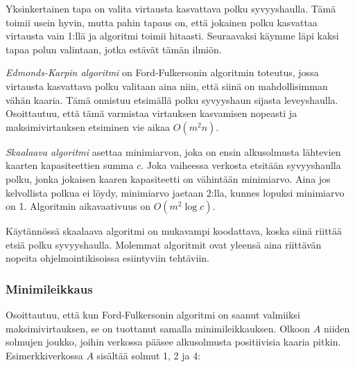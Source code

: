 Yksinkertainen tapa on valita virtausta kasvattava
polku syvyyshaulla.
Tämä toimii usein hyvin, mutta pahin tapaus on,
että jokainen polku
kasvattaa virtausta vain 1:llä ja algoritmi toimii hitaasti.
Seuraavaksi käymme läpi kaksi tapaa polun valintaan,
jotka estävät tämän ilmiön.

\textit{Edmonds-Karpin algoritmi} on
Ford-Fulkersonin algoritmin toteutus,
jossa virtausta kasvattava polku valitaan
aina niin, että siinä on mahdollisimman vähän kaaria.
Tämä onnistuu etsimällä polku syvyyshaun
sijasta leveyshaulla.
Osoittautuu, että tämä varmistaa virtauksen
kasvamisen nopeasti ja
maksimivirtauksen etsiminen vie aikaa $O(m^2 n)$.

\textit{Skaalaava algoritmi}
asettaa minimiarvon, joka on ensin alkusolmusta
lähtevien kaarten kapasiteettien summa $c$.
Joka vaiheessa verkosta etsitään
syvyyshaulla polku, jonka jokaisen kaaren kapasiteetti
on vähintään minimiarvo.
Aina jos kelvollista polkua ei löydy,
minimiarvo jaetaan 2:lla,
kunnes lopuksi minimiarvo on 1.
Algoritmin aikavaativuus on $O(m^2 \log c)$.

Käytännössä skaalaava algoritmi on mukavampi koodattava,
koska siinä riittää etsiä polku syvyyshaulla.
Molemmat algoritmit ovat yleensä aina riittävän
nopeita ohjelmointikisoissa esiintyviin tehtäviin.

\subsubsection{Minimileikkaus}

Osoittautuu, että kun Ford-Fulkersonin algoritmi on saanut valmiiksi
maksimivirtauksen, se on tuottanut samalla minimileikkauksen.
Olkoon $A$ niiden solmujen joukko,
joihin verkossa pääsee
alkusolmusta positiivisia kaaria pitkin.
Esimerkkiverkossa $A$ sisältää solmut 1, 2 ja 4:

